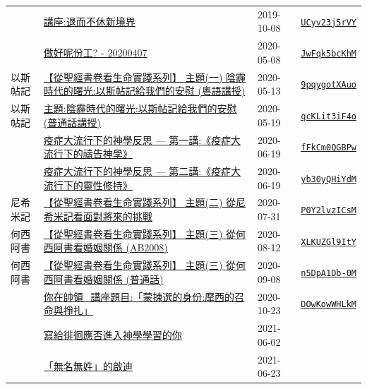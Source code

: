 \documentclass{book}
\begin{document}
{ \scriptsize


\begin{xltabular}{\textwidth}{|p{0.15\textwidth} p{0.6\textwidth}|p{0.07\textwidth} p{0.1\textwidth}|}
\hline
  & \hyperref[sec:UCyv23j5rVY]{講座:退而不休新境界} & 2019-10-08 & \href{https://youtube.com/watch?v=UCyv23j5rVY}{\texttt{UCyv23j5rVY}} \\
  & \hyperref[sec:JwFqk5bcKhM]{做好呢份工? - 20200407} & 2020-05-08 & \href{https://youtube.com/watch?v=JwFqk5bcKhM}{\texttt{JwFqk5bcKhM}} \\
以斯帖記  & \hyperref[sec:9pqygotXAuo]{【從聖經書卷看生命實踐系列】 主題(一) 陰霾時代的曙光:以斯帖記給我們的安慰 (粵語講授)} & 2020-05-13 & \href{https://youtube.com/watch?v=9pqygotXAuo}{\texttt{9pqygotXAuo}} \\
以斯帖記  & \hyperref[sec:qcKLit3iF4o]{主題:陰霾時代的曙光:以斯帖記給我們的安慰 (普通話講授)} & 2020-05-19 & \href{https://youtube.com/watch?v=qcKLit3iF4o}{\texttt{qcKLit3iF4o}} \\
  & \hyperref[sec:fFkCm0QGBPw]{疫症大流行下的神學反思 --- 第一講:《疫症大流行下的禱告神學》} & 2020-06-19 & \href{https://youtube.com/watch?v=fFkCm0QGBPw}{\texttt{fFkCm0QGBPw}} \\
  & \hyperref[sec:yb30yQHiYdM]{疫症大流行下的神學反思 --- 第二講:《疫症大流行下的靈性修持》} & 2020-06-19 & \href{https://youtube.com/watch?v=yb30yQHiYdM}{\texttt{yb30yQHiYdM}} \\
尼希米記  & \hyperref[sec:P0Y2lvzICsM]{【從聖經書卷看生命實踐系列】 主題(二) 從尼希米記看面對將來的挑戰} & 2020-07-31 & \href{https://youtube.com/watch?v=P0Y2lvzICsM}{\texttt{P0Y2lvzICsM}} \\
何西阿書  & \hyperref[sec:XLKUZGl9ItY]{【從聖經書卷看生命實踐系列】 主題(三) 從何西阿書看婚姻關係 (AB2008)} & 2020-08-12 & \href{https://youtube.com/watch?v=XLKUZGl9ItY}{\texttt{XLKUZGl9ItY}} \\
何西阿書  & \hyperref[sec:n5DpA1Db_0M]{【從聖經書卷看生命實踐系列】 主題(三) 從何西阿書看婚姻關係 (普通話)} & 2020-09-08 & \href{https://youtube.com/watch?v=n5DpA1Db-0M}{\texttt{n5DpA1Db-0M}} \\
  & \hyperref[sec:DOwKowWHLkM]{你在帥領\_講座題目:「蒙揀選的身份:摩西的召命與掙扎」} & 2020-10-23 & \href{https://youtube.com/watch?v=DOwKowWHLkM}{\texttt{DOwKowWHLkM}} \\
  & \hyperref[sec:0]{寫給徘徊應否進入神學學習的你} & 2021-06-02 &  \\
  & \hyperref[sec:1]{「無名無姓」的啟迪} & 2021-06-23 &  \\

\end{xltabular}}
\end{document}
